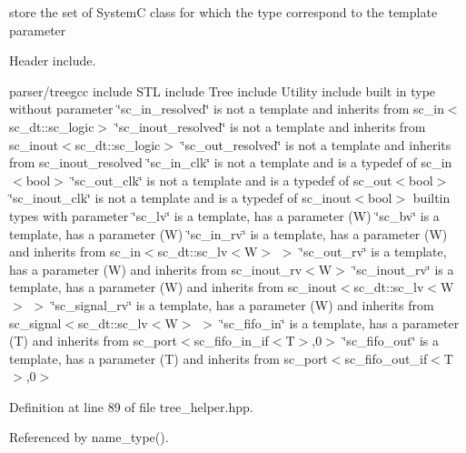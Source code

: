 store the set of SystemC class for which the type correspond to the template parameter 

Header include.

parser/treegcc include S\+TL include Tree include Utility include built in type without parameter \char`\"{}sc\+\_\+in\+\_\+resolved\char`\"{} is not a template and inherits from sc\+\_\+in$<$sc\+\_\+dt\+::sc\+\_\+logic$>$ \char`\"{}sc\+\_\+inout\+\_\+resolved\char`\"{} is not a template and inherits from sc\+\_\+inout$<$sc\+\_\+dt\+::sc\+\_\+logic$>$ \char`\"{}sc\+\_\+out\+\_\+resolved\char`\"{} is not a template and inherits from sc\+\_\+inout\+\_\+resolved \char`\"{}sc\+\_\+in\+\_\+clk\char`\"{} is not a template and is a typedef of sc\+\_\+in$<$bool$>$ \char`\"{}sc\+\_\+out\+\_\+clk\char`\"{} is not a template and is a typedef of sc\+\_\+out$<$bool$>$ \char`\"{}sc\+\_\+inout\+\_\+clk\char`\"{} is not a template and is a typedef of sc\+\_\+inout$<$bool$>$ builtin types with parameter \char`\"{}sc\+\_\+lv\char`\"{} is a template, has a parameter (W) \char`\"{}sc\+\_\+bv\char`\"{} is a template, has a parameter (W) \char`\"{}sc\+\_\+in\+\_\+rv\char`\"{} is a template, has a parameter (W) and inherits from sc\+\_\+in$<$sc\+\_\+dt\+::sc\+\_\+lv$<$\+W$>$ $>$ \char`\"{}sc\+\_\+out\+\_\+rv\char`\"{} is a template, has a parameter (W) and inherits from sc\+\_\+inout\+\_\+rv$<$\+W$>$ \char`\"{}sc\+\_\+inout\+\_\+rv\char`\"{} is a template, has a parameter (W) and inherits from sc\+\_\+inout$<$sc\+\_\+dt\+::sc\+\_\+lv$<$\+W$>$ $>$ \char`\"{}sc\+\_\+signal\+\_\+rv\char`\"{} is a template, has a parameter (W) and inherits from sc\+\_\+signal$<$sc\+\_\+dt\+::sc\+\_\+lv$<$\+W$>$ $>$ \char`\"{}sc\+\_\+fifo\+\_\+in\char`\"{} is a template, has a parameter (T) and inherits from sc\+\_\+port$<$sc\+\_\+fifo\+\_\+in\+\_\+if$<$\+T$>$,0$>$ \char`\"{}sc\+\_\+fifo\+\_\+out\char`\"{} is a template, has a parameter (T) and inherits from sc\+\_\+port$<$sc\+\_\+fifo\+\_\+out\+\_\+if$<$\+T$>$,0$>$ 

Definition at line 89 of file tree\+\_\+helper.\+hpp.



Referenced by name\+\_\+type().

\mbox{\label{classtree__helper_a69599ec0d76a65a522d54e00ccdca29c}} 
